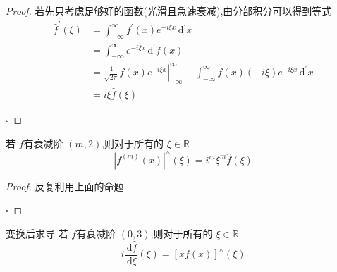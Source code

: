 \documentclass[../../main.tex]{subfiles}
\begin{document}
\begin{proof}
    若先只考虑足够好的函数(光滑且急速衰减),由分部积分可以得到等式 \[
   \begin{aligned}
    \hat{f}^{\prime} \left(  \xi  \right)&= \int_{-\infty}^{\infty}f^{\prime} \left( x \right)e^{-i  \xi x}\,\mathrm{d} ^{\prime} x\\ 
     &=  \int_{-\infty}^{\infty} e^{-i  \xi x} \,\mathrm{d} ^{\prime} f\left( x \right)\\ 
      &= \left. \frac{1 }{\sqrt{2\pi } }f\left( x \right)e^{-i  \xi x}  \right|_{-\infty}^{\infty}- \int_{-\infty}^{\infty}f\left( x \right) \left( -i \xi  \right)e^{-i \xi x}    \,\mathrm{d} ^{\prime} x\\ 
       &=  i \xi  \hat{f}\left(  \xi  \right) 
    \end{aligned}   
    \]

    \hfill $\square$
\end{proof}

\begin{corollary}
  若 \(  f  \)有衰减阶 \(  \left( m,2 \right)   \),则对于所有的 \(   \xi  \in \mathbb{R}   \) \[
  \left| f^{\left( m \right) }\left( x \right)  \right|^{\wedge }\left(  \xi  \right)= i^{m}  \xi ^{m}\hat{f}\left(  \xi  \right)   
  \]     
\end{corollary}
\begin{proof}
    反复利用上面的命题.

    \hfill $\square$
\end{proof}

\begin{proposition}{变换后求导}
    若 \(  f  \)有衰减阶 \(  \left( 0,3 \right)   \),则对于所有的 \(   \xi  \in \mathbb{R}   \) \[
    i \frac{\,\mathrm{d} \hat{f} }{ \,\mathrm{d}  \xi }\left(  \xi  \right)= \left[ xf\left( x \right)  \right]^{\wedge }\left(  \xi  \right)    
    \]   
\end{proposition}
\end{document}
